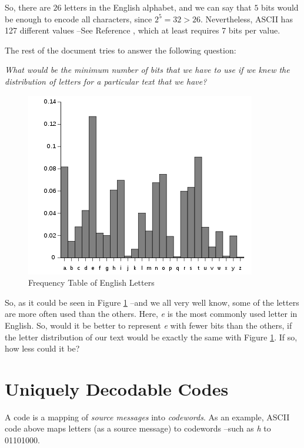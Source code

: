 \documentclass[11pt]{article}
\begin{document}
So, there are $26$ letters in the English alphabet, and we can say that $5$ bits would be enough to encode all characters, since $2^{5} = 32 > 26$. Nevertheless, ASCII has 127 different values --See Reference \cite{ascii}, which at least requires 7 bits per value. 

The rest of the document tries to answer the following question:

\begin{center}
\textit{What would be the minimum number of bits that we have to use if we knew the distribution of letters for a particular text that we have?}
\end{center}

\begin{figure}[ht!]
\centering
\includegraphics[width=\linewidth]{img/english_histogram.png}
\caption{Frequency Table of English Letters \label{fig:letter_histogram}}
\end{figure}

So, as it could be seen in Figure \ref{fig:letter_histogram} --and we all very well know, some of the letters are more often used than the others. Here, \textit{e} is the most commonly used letter in English. So, would it be better to represent \textit{e} with fewer bits than the others, if the letter distribution of our text would be exactly the same with Figure \ref{fig:letter_histogram}. If so, how less could it be?

\section{Uniquely Decodable Codes}
A code is a mapping of \textit{source messages} into \textit{codewords}. As an example, ASCII code above maps letters (as a source message) to codewords --such as \textit{h} to 01101000. 
\end{document}
